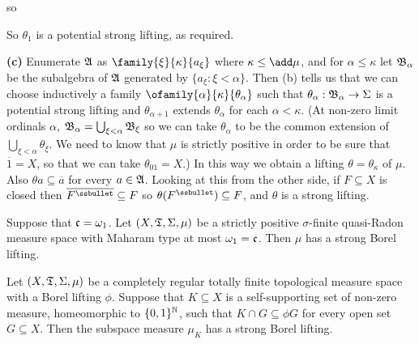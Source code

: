 {

\noindent so


\noindent So $\theta_1$ is a potential strong lifting, as required.\
\Qed


{\bf (c)} Enumerate $\frak A$ as $\family{\xi}{\kappa}{a_{\xi}}$ where
$\kappa\le\add\mu$, and for $\alpha\le\kappa$ let $\frak B_{\alpha}$ be
the subalgebra of $\frak A$ generated by $\{a_{\xi}:\xi<\alpha\}$.
Then (b) tells us that we can choose inductively a family
$\ofamily{\alpha}{\kappa}{\theta_{\alpha}}$ such that
$\theta_{\alpha}:\frak B_{\alpha}\to\Sigma$ is a potential strong
lifting and $\theta_{\alpha+1}$ extends $\theta_{\alpha}$ for each
$\alpha<\kappa$.   (At non-zero limit ordinals $\alpha$,
$\frak B_{\alpha}=\bigcup_{\xi<\alpha}\frak B_{\xi}$ so we can take
$\theta_{\alpha}$ to be the common extension of
$\bigcup_{\xi<\alpha}\theta_{\xi}$.   We need to know that $\mu$ is
strictly positive in order to be sure that $\overline{1}=X$, so that we
can take $\theta_01=X$.)   In this way we obtain a lifting
$\theta=\theta_{\kappa}$ of $\mu$.   Also
$\theta a\subseteq\overline{a}$ for every $a\in\frak A$.   Looking at
this from the other side, if $F\subseteq X$ is closed then
$\overline{F^{\ssbullet}}\subseteq F$ so
$\theta(F^{\ssbullet})\subseteq F$, and $\theta$ is a strong lifting.
}%

Suppose that $\frak c=\omega_1$.   Let $(X,\frak T,\Sigma,\mu)$ be a
strictly positive $\sigma$-finite quasi-Radon measure space with Maharam
type at most $\omega_1=\frak c$.   Then $\mu$ has a strong Borel
lifting.



 Let $(X,\frak T,\Sigma,\mu)$ be a completely
regular totally finite topological measure space with a Borel lifting
$\phi$.   Suppose that $K\subseteq X$ is a self-supporting set of
non-zero measure, homeomorphic to $\{0,1\}^{\Bbb N}$, such that
$K\cap G\subseteq\phi G$
for every open set $G\subseteq X$.   Then the subspace measure $\mu_K$
has a strong Borel lifting.

